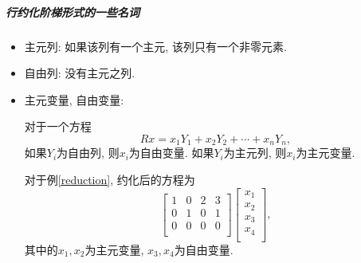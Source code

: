 \subparagraph{行约化阶梯形式的一些名词}
\begin{itemize}
    \item 主元列: 如果该列有一个主元, 该列只有一个非零元素.
    
    \item 自由列: 没有主元之列.
    
    \item 主元变量, 自由变量:
    
    对于一个方程
    \begin{equation}
      Rx = x_1 Y_1 + x_2  Y_2 + \cdots  + x_n Y_n,
    \end{equation}
    如果$Y_i$为自由列, 则$x_i$为自由变量. 如果$Y_i$为主元列, 则$x_i$为主元变量.

    对于例\ref{reduction}, 约化后的方程为
    \begin{equation}
      \begin{bmatrix}
       1 & 0 & 2 & 3\\
       0 & 1 & 0 & 1\\
       0 & 0 & 0 & 0\\
      \end{bmatrix}
      \begin{bmatrix}
       x_1\\
       x_2\\
       x_3\\
       x_4\\
      \end{bmatrix},
    \end{equation}
    其中的$x_1,x_2$为主元变量, $x_3, x_4$为自由变量.
\end{itemize}
